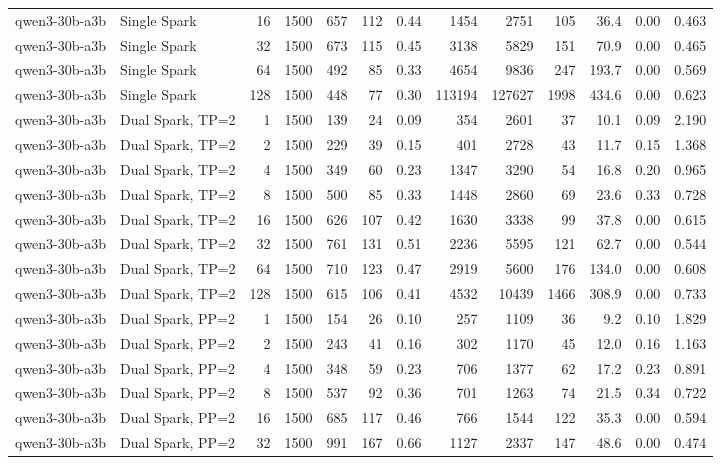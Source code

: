 \begin{tabular}{l l r r r r r r r r r r r}
qwen3-30b-a3b & Single Spark & 16 & 1500 & 657 & 112 & 0.44 & 1454 & 2751 & 105 & 36.4 & 0.00 & 0.463 \\
qwen3-30b-a3b & Single Spark & 32 & 1500 & 673 & 115 & 0.45 & 3138 & 5829 & 151 & 70.9 & 0.00 & 0.465 \\
qwen3-30b-a3b & Single Spark & 64 & 1500 & 492 & 85 & 0.33 & 4654 & 9836 & 247 & 193.7 & 0.00 & 0.569 \\
qwen3-30b-a3b & Single Spark & 128 & 1500 & 448 & 77 & 0.30 & 113194 & 127627 & 1998 & 434.6 & 0.00 & 0.623 \\
\addlinespace
qwen3-30b-a3b & Dual Spark, TP=2 & 1 & 1500 & 139 & 24 & 0.09 & 354 & 2601 & 37 & 10.1 & 0.09 & 2.190 \\
qwen3-30b-a3b & Dual Spark, TP=2 & 2 & 1500 & 229 & 39 & 0.15 & 401 & 2728 & 43 & 11.7 & 0.15 & 1.368 \\
qwen3-30b-a3b & Dual Spark, TP=2 & 4 & 1500 & 349 & 60 & 0.23 & 1347 & 3290 & 54 & 16.8 & 0.20 & 0.965 \\
qwen3-30b-a3b & Dual Spark, TP=2 & 8 & 1500 & 500 & 85 & 0.33 & 1448 & 2860 & 69 & 23.6 & 0.33 & 0.728 \\
qwen3-30b-a3b & Dual Spark, TP=2 & 16 & 1500 & 626 & 107 & 0.42 & 1630 & 3338 & 99 & 37.8 & 0.00 & 0.615 \\
qwen3-30b-a3b & Dual Spark, TP=2 & 32 & 1500 & 761 & 131 & 0.51 & 2236 & 5595 & 121 & 62.7 & 0.00 & 0.544 \\
qwen3-30b-a3b & Dual Spark, TP=2 & 64 & 1500 & 710 & 123 & 0.47 & 2919 & 5600 & 176 & 134.0 & 0.00 & 0.608 \\
qwen3-30b-a3b & Dual Spark, TP=2 & 128 & 1500 & 615 & 106 & 0.41 & 4532 & 10439 & 1466 & 308.9 & 0.00 & 0.733 \\
\addlinespace
qwen3-30b-a3b & Dual Spark, PP=2 & 1 & 1500 & 154 & 26 & 0.10 & 257 & 1109 & 36 & 9.2 & 0.10 & 1.829 \\
qwen3-30b-a3b & Dual Spark, PP=2 & 2 & 1500 & 243 & 41 & 0.16 & 302 & 1170 & 45 & 12.0 & 0.16 & 1.163 \\
qwen3-30b-a3b & Dual Spark, PP=2 & 4 & 1500 & 348 & 59 & 0.23 & 706 & 1377 & 62 & 17.2 & 0.23 & 0.891 \\
qwen3-30b-a3b & Dual Spark, PP=2 & 8 & 1500 & 537 & 92 & 0.36 & 701 & 1263 & 74 & 21.5 & 0.34 & 0.722 \\
qwen3-30b-a3b & Dual Spark, PP=2 & 16 & 1500 & 685 & 117 & 0.46 & 766 & 1544 & 122 & 35.3 & 0.00 & 0.594 \\
qwen3-30b-a3b & Dual Spark, PP=2 & 32 & 1500 & 991 & 167 & 0.66 & 1127 & 2337 & 147 & 48.6 & 0.00 & 0.474 \\

\end{tabular}

